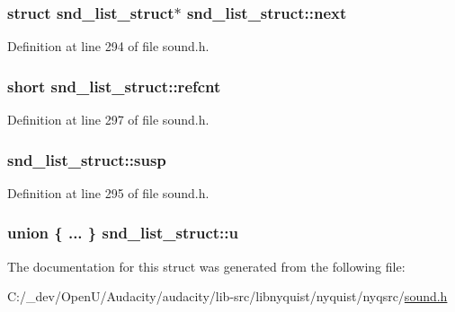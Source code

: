 \subsubsection[{\texorpdfstring{next}{next}}]{\setlength{\rightskip}{0pt plus 5cm}struct {\bf snd\+\_\+list\+\_\+struct}$\ast$ snd\+\_\+list\+\_\+struct\+::next}\hypertarget{structsnd__list__struct_a3a9e571a923a7496eabe0d721e497fbf}{}\label{structsnd__list__struct_a3a9e571a923a7496eabe0d721e497fbf}


Definition at line 294 of file sound.\+h.

\subsubsection[{\texorpdfstring{refcnt}{refcnt}}]{\setlength{\rightskip}{0pt plus 5cm}short snd\+\_\+list\+\_\+struct\+::refcnt}\hypertarget{structsnd__list__struct_a27044dc0ac840d508156da70b7b8eec5}{}\label{structsnd__list__struct_a27044dc0ac840d508156da70b7b8eec5}


Definition at line 297 of file sound.\+h.

\subsubsection[{\texorpdfstring{susp}{susp}}]{ snd\+\_\+list\+\_\+struct\+::susp}\hypertarget{structsnd__list__struct_a57f7d6b31a871ee6d94757b409f636ee}{}\label{structsnd__list__struct_a57f7d6b31a871ee6d94757b409f636ee}


Definition at line 295 of file sound.\+h.

\subsubsection[{\texorpdfstring{u}{u}}]{\setlength{\rightskip}{0pt plus 5cm}union \{ ... \}         snd\+\_\+list\+\_\+struct\+::u}\hypertarget{structsnd__list__struct_a7eb4e39c02b1fa81d1000b204f888777}{}\label{structsnd__list__struct_a7eb4e39c02b1fa81d1000b204f888777}


The documentation for this struct was generated from the following file\+:\begin{DoxyCompactItemize}
\item 
C\+:/\+\_\+dev/\+Open\+U/\+Audacity/audacity/lib-\/src/libnyquist/nyquist/nyqsrc/\hyperlink{sound_8h}{sound.\+h}\end{DoxyCompactItemize}
